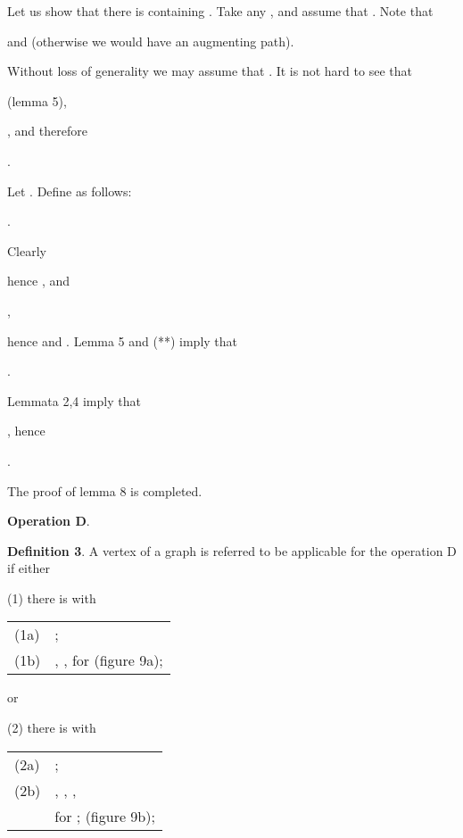 \documentclass{article}
\begin{document}
Let us show that there is 
containing . Take any  , and
assume that . Note that

\begin{center}
 and  (otherwise we would
have an augmenting path).
\end{center}

Without loss of generality we may assume that . It is not hard
to see that

\begin{center}
 (lemma 5),

, and therefore

.
\end{center}

Let . Define  as follows:

\begin{center}
.
\end{center}

Clearly

\begin{center}
 hence , and

,
\end{center}

hence  and . Lemma 5 and (**) imply that

\begin{center}
.
\end{center}

Lemmata 2,4 imply that

\begin{center}
, hence

.
\end{center}

The proof of lemma 8 is completed.

\bigskip

\textbf{Operation D}.

\textbf{Definition 3}. A vertex  of a graph  is referred to be
applicable for the operation D if either

(1) there is  with

\qquad 
\begin{tabular}{ll}
(1a) & ; \\ 
(1b) & , ,  for  (figure 9a);\end{tabular}

or

(2) there is  with

\qquad 
\begin{tabular}{ll}
(2a) & ; \\ 
(2b) & , , , \\ 
&  for ;  (figure
9b);\end{tabular}
\end{document}

